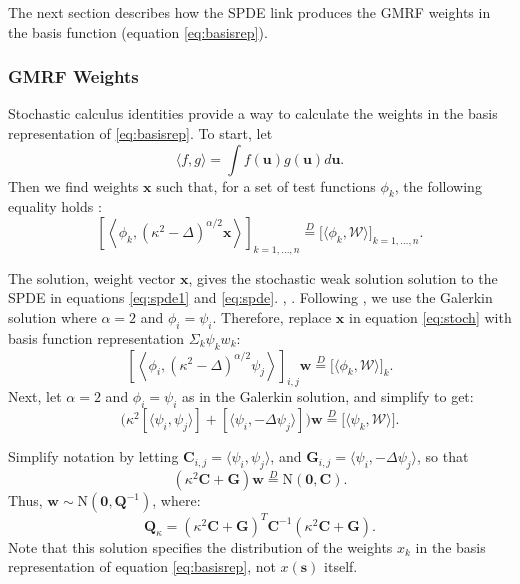 The next section describes how the SPDE link produces the GMRF weights in the basis function (equation \ref{eq:basisrep}).

\subsubsection{GMRF Weights}

Stochastic calculus identities provide a way to calculate the weights in the basis representation of \ref{eq:basisrep}. To start, let $$\langle f, g \rangle = \int f(\pmb{u}) g(\pmb{u}) d\pmb{u}.$$ 
Then we find weights $\pmb{x}$ such that, for a set of test functions $\phi_{k}$, the following equality holds \citep{Lindgren2011}:
\begin{equation} \label{eq:stoch}
\left[ \left< \phi_{k}, (\kappa^{2} - \Delta)^{\alpha/2} \pmb{x} \right> \right]_{k = 1, \hdots, n} \overset{D}{=} \Big[ \langle \phi_{k}, \mathcal{W} \rangle \Big]_{k = 1, \hdots, n}.
\end{equation}

The solution, weight vector $\pmb{x}$, gives the stochastic weak solution solution to the SPDE in equations \ref{eq:spde1} and \ref{eq:spde}. \citep{Mao2007}, \cite{Lindstrom2014}. Following \cite{Lindgren2011}, we use the Galerkin solution where $\alpha = 2$ and $\phi_{i} = \psi_{i}$. Therefore, replace $\pmb{x}$ in equation \ref{eq:stoch} with basis function representation $\Sigma_{k}\psi_{k}w_{k}$:
$$ \left[ \left< \phi_{i}, (\kappa^{2} - \Delta)^{\alpha/2} \psi_{j} \right> \right]_{i,j}\pmb{w} \overset{D}{=} \Big[ \langle \phi_{k}, \mathcal{W} \rangle \Big]_{k}.$$
Next, let $\alpha = 2$ and $\phi_{i} = \psi_{i}$ as in the Galerkin solution, and simplify to get:
$$ \Big(
\kappa^{2} [ \langle \psi_{i}, \psi_{j} \rangle ] + [ \langle \psi_{i}, -\Delta \psi_{j} \rangle ]
\Big) \pmb{w} \overset{D}{=} \Big[ \langle \psi_{k}, \mathcal{W} \rangle \Big]. $$

Simplify notation by letting $\pmb{C}_{i,j} = \langle \psi_{i}, \psi_{j} \rangle$, and $ \pmb{G}_{i,j} = \langle \psi_{i}, - \Delta \psi_{j} \rangle$, so that
$$ \left(
\kappa^{2} \pmb{C} + \pmb{G} \right) \pmb{w} \overset{D}{=} \text{N}(\pmb{0},\pmb{C}).$$
Thus, $\pmb{w} \sim \text{N}(\pmb{0}, \pmb{Q}^{-1})$, where:
\begin{equation} \label{eq:Q}
\pmb{Q}_{\kappa} = \left( \kappa^{2} \pmb{C} + \pmb{G} \right)^{T} \pmb{C}^{-1} \left( \kappa^{2} \pmb{C} + \pmb{G} \right).
\end{equation}
Note that this solution specifies the distribution of the weights $x_{k}$ in the basis representation of equation \ref{eq:basisrep}, not $x(\pmb{s})$ itself.

